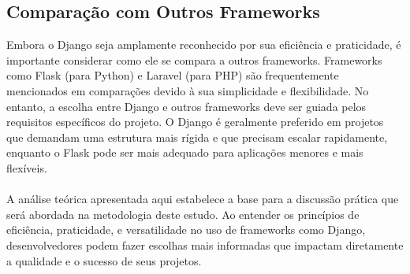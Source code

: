 \documentclass[11pt]{article} %
\begin{document}
\subsection{Comparação com Outros Frameworks}
Embora o Django seja amplamente reconhecido por sua eficiência e praticidade, é importante considerar como ele se compara a outros frameworks. Frameworks como Flask (para Python) e Laravel (para PHP) são frequentemente mencionados em comparações devido à sua simplicidade e flexibilidade. No entanto, a escolha entre Django e outros frameworks deve ser guiada pelos requisitos específicos do projeto. O Django é geralmente preferido em projetos que demandam uma estrutura mais rígida e que precisam escalar rapidamente, enquanto o Flask pode ser mais adequado para aplicações menores e mais flexíveis.
 \\\\
A análise teórica apresentada aqui estabelece a base para a discussão prática que será abordada na metodologia deste estudo. Ao entender os princípios de eficiência, praticidade, e versatilidade no uso de frameworks como Django, desenvolvedores podem fazer escolhas mais informadas que impactam diretamente a qualidade e o sucesso de seus projetos.


\maketitle
\end{document}
